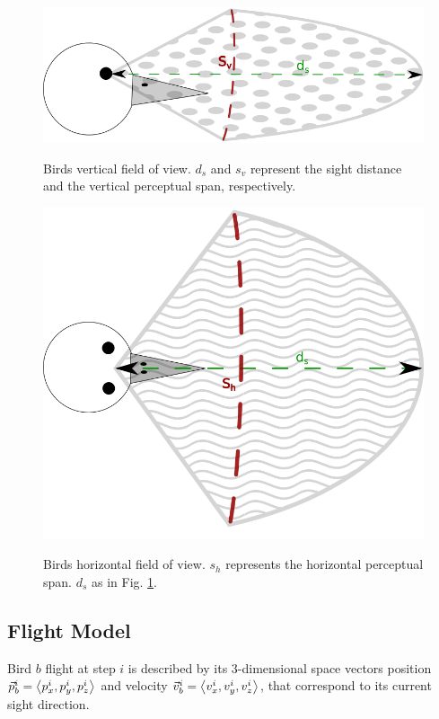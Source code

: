 \begin{figure}[h!]
	\includegraphics[scale=0.45]{./images/birdflocking/verticalFow.png}
	\label{fig:vFOV}
	\caption{Birds vertical field of view. \(d_s\) and \(s_v\) represent the sight distance and the vertical perceptual span, respectively. }
\end{figure}	

\begin{figure}[h!]
	\centering
	\includegraphics[scale=0.375]{./images/birdflocking/hFow.png}
	\label{fig:hFOV}
	\caption{Birds horizontal field of view. \(s_h\) represents the horizontal perceptual span. \(d_s\) as in Fig. \ref{fig:vFOV}. }
\end{figure}	


\subsection{Flight Model}
Bird $b$ flight at step $i$ is described by its $3$-dimensional space vectors
position $\vec{p}_b^i=\expval{p^i_x,p^i_y,p^i_z}$ and velocity
$\vec{v}_b^i=\expval{v^i_x,v^i_y,v^i_z}$, that correspond to its current sight
direction. 


